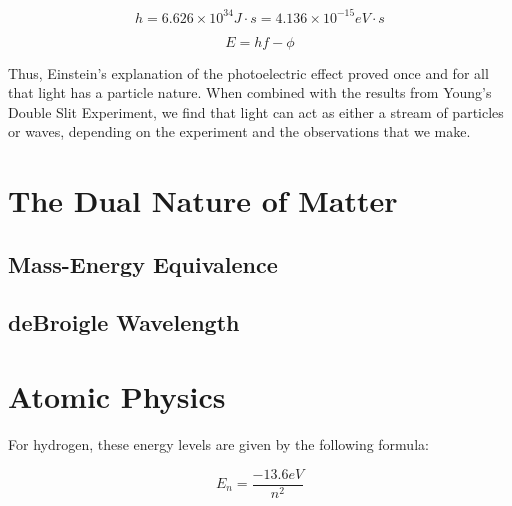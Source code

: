 	\begin{mdframed}[backgroundcolor=green!20!white]
	\begin{equation*}
		h = 6.626 \times 10^{34} \si{J \cdot s} = 4.136 \times 10^{-15} \si{eV \cdot s}
		\label{equation:planck}
	\end{equation*}
\end{mdframed}	



	\begin{mdframed}[backgroundcolor=orange!20!white]
	\begin{equation}
		E = h f - \phi
		\label{eqn:Photoelectric}
	\end{equation}
\end{mdframed}


Thus, Einstein's explanation of the photoelectric effect proved once and for all that light has a particle nature.  When combined with the results from Young's Double Slit Experiment, we find that light can act as either a stream of particles or waves, depending on the experiment and the observations that we make.  


\section{The Dual Nature of Matter} 
\subsection{Mass-Energy Equivalence} 
\subsection{deBroigle Wavelength} 

\section{Atomic Physics} 


For hydrogen, these energy levels are given by the following formula:

\begin{mdframed}[backgroundcolor=orange!20!white]
	\begin{equation}
	E_n = \frac{-13.6 \si{eV}}{n^2}  
	\label{eqn:hydrogenenergy}
	\end{equation}
\end{mdframed}

